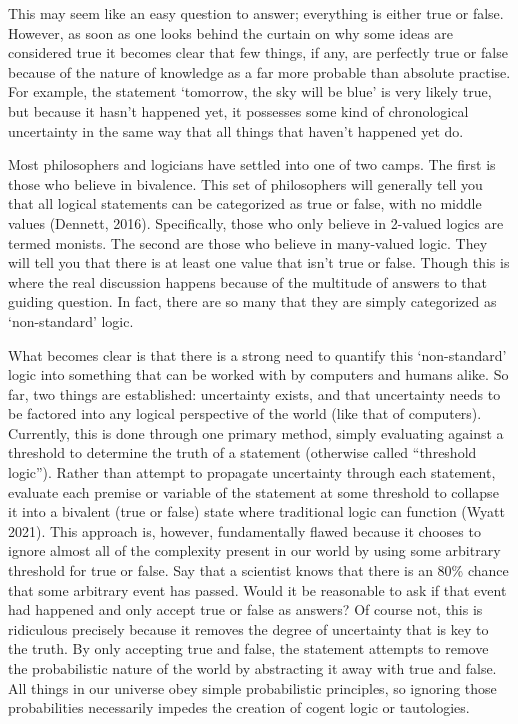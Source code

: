 \documentclass{article}
\begin{document}
This may seem like an easy question to answer; everything is either true or false. However, as soon as one looks behind the curtain on why some ideas are considered true it becomes clear that few things, if any, are perfectly true or false because of the nature of knowledge as a far more probable than absolute practise. For example, the statement ‘tomorrow, the sky will be blue’ is very likely true, but because it hasn’t happened yet, it possesses some kind of chronological uncertainty in the same way that all things that haven’t happened yet do. 

Most philosophers and logicians have settled into one of two camps. The first is those who believe in bivalence. This set of philosophers will generally tell you that all logical statements can be categorized as true or false, with no middle values (Dennett, 2016). Specifically, those who only believe in 2-valued logics are termed monists. The second are those who believe in many-valued logic. They will tell you that there is at least one value that isn’t true or false. Though this is where the real discussion happens because of the multitude of answers to that guiding question. In fact, there are so many that they are simply categorized as ‘non-standard’ logic. 

What becomes clear is that there is a strong need to quantify this ‘non-standard’ logic into something that can be worked with by computers and humans alike. So far, two things are established: uncertainty exists, and that uncertainty needs to be factored into any logical perspective of the world (like that of computers). Currently, this is done through one primary method, simply evaluating against a threshold to determine the truth of a statement (otherwise called “threshold logic”). Rather than attempt to propagate uncertainty through each statement, evaluate each premise or variable of the statement at some threshold to collapse it into a bivalent (true or false) state where traditional logic can function (Wyatt 2021). This approach is, however, fundamentally flawed because it chooses to ignore almost all of the complexity present in our world by using some arbitrary threshold for true or false. Say that a scientist knows that there is an 80\% chance that some arbitrary event has passed. Would it be reasonable to ask if that event had happened and only accept true or false as answers? Of course not, this is ridiculous precisely because it removes the degree of uncertainty that is key to the truth. By only accepting true and false, the statement attempts to remove the probabilistic nature of the world by abstracting it away with true and false. All things in our universe obey simple probabilistic principles, so ignoring those probabilities necessarily impedes the creation of cogent logic or tautologies.
\end{document}
